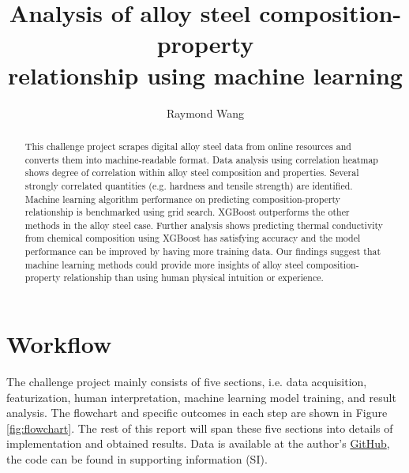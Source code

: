 \documentclass[10pt,aps,prb,amsmath,amssymb,twocolumn,letterpaper,nobalancelastpage,final,citeautoscript,floatfix,raggedbottom,superscriptaddress]{revtex4-1}
\begin{document}
\title{Analysis of alloy steel composition-property \\ relationship using machine learning}

\author{Raymond Wang}

  

\begin{abstract}
This challenge project scrapes digital alloy steel data from online resources and converts them into machine-readable format. Data analysis using correlation heatmap shows degree of correlation within alloy steel composition and properties. Several strongly correlated quantities (e.g. hardness and tensile strength) are identified. Machine learning algorithm performance on predicting composition-property relationship is benchmarked using grid search. XGBoost outperforms the other methods in the alloy steel case. Further analysis shows predicting thermal conductivity from chemical composition using XGBoost has satisfying accuracy and the model performance can be improved by having more training data. Our findings suggest that machine learning methods could provide more insights of alloy steel composition-property relationship than using human physical intuition or experience.
\end{abstract}

\maketitle


\section{Workflow}

The challenge project mainly consists of five sections, i.e. data acquisition, featurization, human interpretation, machine learning model training, and result analysis. The flowchart and specific outcomes in each step are shown in Figure \ref{fig:flowchart}. The rest of this report will span these five sections into details of implementation and obtained results. Data is available at the author's \href{https://github.com/raymond931118/scraping}{GitHub}, the code can be found in supporting information (SI).
\end{document}
